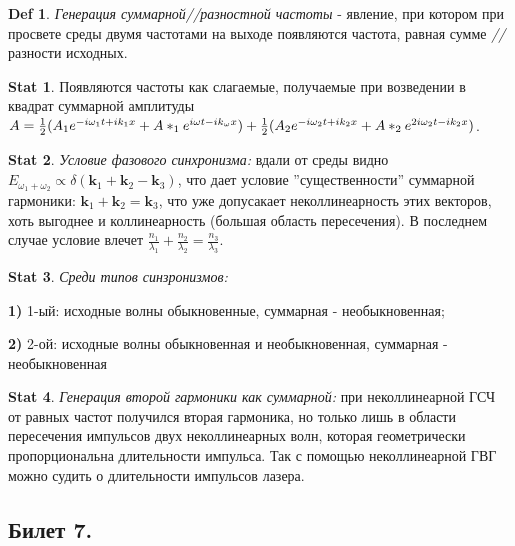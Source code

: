 \documentclass[a4paper,12pt]{article}
\theoremstyle{definition} %
\newtheorem{Stat}{Stat}[section]
\theoremstyle{definition} %
\newtheorem{Def}{Def}[section]
\theoremstyle{remark} %
\begin{document}
\begin{Def}\label{def \theDef}
	\textit{Генерация суммарной//разностной частоты} - явление, при котором при просвете среды двумя частотами на выходе появляются частота, равная сумме \textit{//} разности исходных.
\end{Def}
\begin{Stat}\label{stat \theStat}
	Появляются частоты как слагаемые, получаемые при возведении в квадрат суммарной амплитуды $A = \frac{1}{2} (A_{1}e^{-i\omega_{1} t +i k_{1}x} + A*_{1}e^{i\omega t -i k_{\omega}x}) + \\ \frac{1}{2} (A_{2}e^{-i\omega_{2} t +i k_{2}x} + A*_{2}e^{2i\omega_{2} t -i k_{2}x})$.
\end{Stat}
\begin{Stat}\label{stat \theStat}
	\textit{Условие фазового синхронизма:} вдали от среды видно $E_{\omega_{1}+\omega_{2}} \propto \delta(\mathbf{k}_{1}+\mathbf{k}_{2}-\mathbf{k}_{3})$, что дает условие ''существенности'' суммарной гармоники: $\mathbf{k}_{1}+\mathbf{k}_{2}=\mathbf{k}_{3}$, что уже допусакает неколлинеарность этих векторов, хоть выгоднее и коллинеарность (большая область пересечения). В последнем случае условие влечет $\frac{n_{1}}{\lambda_{1}}+\frac{n_{2}}{\lambda_{2}}=\frac{n_{3}}{\lambda_{3}}$.
\end{Stat}
\begin{Stat}\label{stat \theStat}
	\textit{Среди типов синзронизмов:} \\
	\par \textbf{1)} 1-ый: исходные волны обыкновенные, суммарная - необыкновенная;\\
	\par \textbf{2)} 2-ой: исходные волны обыкновенная и необыкновенная, суммарная - необыкновенная
\end{Stat}
\begin{Stat}\label{stat \theStat}
	\textit{Генерация второй гармоники как суммарной:} при неколлинеарной ГСЧ от равных частот получился вторая гармоника, но только лишь в области пересечения импульсов двух неколлинеарных волн, которая геометрически пропорциональна длительности импульса. Так с помощью неколлинеарной ГВГ можно судить о длительности импульсов лазера.
\end{Stat}

\subsection{Билет 7.}
\end{document}
